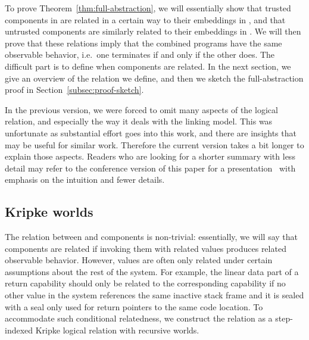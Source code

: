 To prove Theorem~\ref{thm:full-abstraction}, we will essentially show that trusted components in \srccm{} are related in a certain way to their embeddings in \trgcm{}, and that untrusted \trgcm{} components are similarly related to their embeddings in \srccm{}.
We will then prove that these relations imply that the combined programs have the same observable behavior, i.e.\ one terminates if and only if the other does.
The difficult part is to define when components are related.
In the next section, we give an overview of the relation we define, and then we sketch the full-abstraction proof in Section~\ref{subsec:proof-sketch}.

\begin{jversion}
  In the previous version, we were forced to omit many aspects of the logical relation, and especially the way it deals with the linking model.
  This was unfortunate as substantial effort goes into this work, and there are insights that may be useful for similar work.
  Therefore the current version takes a bit longer to explain those aspects.
  Readers who are looking for a shorter summary with less detail may refer to the conference version of this paper for a presentation~\citep{skorstengaard_stktokens_2019} with emphasis on the intuition and fewer details.
\end{jversion}

\subsection{Kripke worlds}
\label{subsec:worlds}
The relation between \srccm{} and \trgcm{} components is non-trivial: essentially, we will say that components are related if invoking them with related values produces related observable behavior.
However, values are often only related under certain assumptions about the rest of the system.
For example, the linear data part of a return capability should only be related to the corresponding \srccm{} capability if no other value in the system references the same inactive stack frame and it is sealed with a seal only used for return pointers to the same code location.
To accommodate such conditional relatedness, we construct the relation as a step-indexed Kripke logical relation with recursive worlds.

